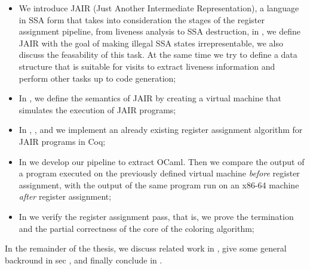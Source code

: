 \begin{itemize}
    \item We introduce JAIR (Just Another Intermediate Representation), a language in SSA form that takes into consideration the stages of the register assignment pipeline, from liveness analysis to SSA destruction, in , we define JAIR with the goal of making illegal SSA states irrepresentable, we also discuss the feasability of this task. At the same time we try to define a data structure that is suitable for visits to extract liveness information and perform other tasks up to code generation;

    \item In , we define the semantics of JAIR by creating a virtual machine that simulates the execution of JAIR programs;

    \item In , , and  we implement an already existing register assignment algorithm for JAIR programs in Coq;

    \item In  we develop our pipeline to extract OCaml. Then we compare the output of a program executed on the previously defined virtual machine \textit{before} register assignment, with the output of the same program run on an x86-64 machine \textit{after} register assignment;

    \item In  we verify the register assignment pass, that is, we prove the termination and the {\color{red} partial correctness} of the core of the coloring algorithm;
\end{itemize}

In the remainder of the thesis, we discuss related work in , give some general backround in sec , and finally conclude in .

